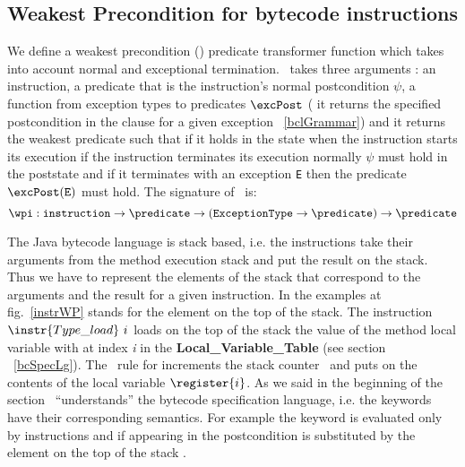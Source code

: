 \subsection{Weakest Precondition for bytecode instructions}\label{wpInstr}
We define a weakest precondition (\wpi) predicate transformer function which takes into account normal and exceptional termination. 
\wpi \ takes three arguments : an instruction, a predicate that is the instruction's normal postcondition $\psi$, a function
from exception types to predicates $\excPost$ ( it returns the specified postcondition in the  clause for a given exception ~\ref{bclGrammar})  and it returns the weakest predicate such that if it holds in the state when the instruction starts its execution if the instruction terminates its execution normally  $\psi$ must hold in the poststate and if it terminates with an exception \texttt{E} then the predicate $\excPost(\tt{E})$ must hold. The signature of \wpi \ is:
$$\wpi : \texttt{instruction} \rightarrow \predicate \rightarrow (\tt{ ExceptionType} \rightarrow  \predicate) \rightarrow \predicate   $$

 The Java bytecode language is stack based, i.e. the instructions take their arguments from the method execution stack and 
 put the result on the stack. Thus we have to represent the elements of the stack that correspond to the arguments and the result for a given instruction. 
 In the examples at fig.~\ref{instrWP} \stack{\counter} stands for the element on the top of the stack. 
 The instruction $\instr{Type\_load} \ i$  loads on the top of the stack the value of the method local variable with at index \textit{i}
 in the \textbf{Local\_Variable\_Table} (see section ~\ref{bcSpecLg}). The \wpi \ rule for   increments the stack
counter \counter \ and puts on \stack{\counter} the contents of the local variable $\register{i}$.
As we said in the beginning of the section \wpi \ ``understands'' the bytecode specification language, i.e. the keywords have their 
corresponding semantics. For example the keyword  is evaluated only by  
instructions and if appearing in the postcondition   is substituted by the element on the top of 
the stack \stack{\counter}. 

